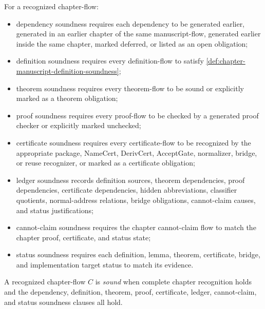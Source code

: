\begin{definition}
\label{def:chapter-manuscript-chapter-soundness-clauses}
For a recognized chapter-flow:
\begin{itemize}
\item dependency soundness requires each dependency to be generated earlier, generated in an earlier chapter of the same manuscript-flow, generated earlier inside the same chapter, marked deferred, or listed as an open obligation;
\item definition soundness requires every definition-flow to satisfy \autoref{def:chapter-manuscript-definition-soundness};
\item theorem soundness requires every theorem-flow to be sound or explicitly marked as a theorem obligation;
\item proof soundness requires every proof-flow to be checked by a generated proof checker or explicitly marked unchecked;
\item certificate soundness requires every certificate-flow to be recognized by the appropriate package, NameCert, DerivCert, AcceptGate, normalizer, bridge, or reuse recognizer, or marked as a certificate obligation;
\item ledger soundness records definition sources, theorem dependencies, proof dependencies, certificate dependencies, hidden abbreviations, classifier quotients, normal-address relations, bridge obligations, cannot-claim causes, and status justifications;
\item cannot-claim soundness requires the chapter cannot-claim flow to match the chapter proof, certificate, and status state;
\item status soundness requires each definition, lemma, theorem, certificate, bridge, and implementation target status to match its evidence.
\end{itemize}
\end{definition}

\begin{definition}
\label{def:chapter-manuscript-sound-chapter-flow}
A recognized chapter-flow $C$ is \emph{sound} when complete chapter recognition holds and the dependency, definition, theorem, proof, certificate, ledger, cannot-claim, and status soundness clauses all hold.
\end{definition}

